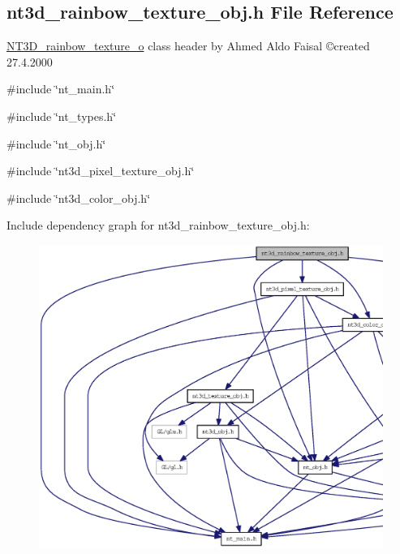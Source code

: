 \subsection{nt3d\_\-rainbow\_\-texture\_\-obj.h File Reference}
\label{nt3d__rainbow__texture__obj_8h}



\begin{DoxyItemize}
\item \hyperlink{class_n_t3_d__rainbow__texture__o}{NT3D\_\-rainbow\_\-texture\_\-o} class header by Ahmed Aldo Faisal \copyright created 27.4.2000 
\end{DoxyItemize} 


{\ttfamily \#include \char`\"{}nt\_\-main.h\char`\"{}}\par
{\ttfamily \#include \char`\"{}nt\_\-types.h\char`\"{}}\par
{\ttfamily \#include \char`\"{}nt\_\-obj.h\char`\"{}}\par
{\ttfamily \#include \char`\"{}nt3d\_\-pixel\_\-texture\_\-obj.h\char`\"{}}\par
{\ttfamily \#include \char`\"{}nt3d\_\-color\_\-obj.h\char`\"{}}\par
Include dependency graph for nt3d\_\-rainbow\_\-texture\_\-obj.h:
\nopagebreak
\begin{figure}[H]
\begin{center}
\leavevmode
\includegraphics[width=400pt]{nt3d__rainbow__texture__obj_8h__incl}
\end{center}
\end{figure}
